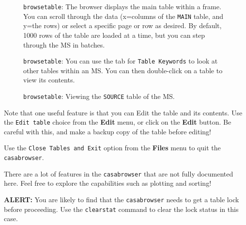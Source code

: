 \begin{figure}[h!]
\begin{center}
\caption{\label{fig:qcasabrowser1} {\tt browsetable}: The browser displays
  the main table within a frame. You can scroll
  through the data (x=columns of the {\tt MAIN} table, and y=the rows) or
  select a specific page or row as desired.  By default, 1000 rows of
  the table are loaded at a time, but you can step through the MS in batches.} 
\hrulefill
\end{center}
\end{figure}

\begin{figure}[h!]
\begin{center}
\caption{\label{fig:qcasabrowser2} {\tt browsetable}: You can use the
  tab for {\tt Table Keywords} to look at other tables within an MS.
  You can then double-click on a table to view its contents.} 
\hrulefill
\end{center}
\end{figure}
 
\begin{figure}[h!]
\begin{center}
\caption{\label{fig:qcasabrowser3} {\tt browsetable}: Viewing the 
{\tt SOURCE} table of the MS.}
\hrulefill
\end{center}
\end{figure}

Note that one useful feature is that you can Edit the table and its
contents.  Use the {\tt Edit table} choice from the {\bf Edit} menu,
or click on the {\bf Edit} button.  Be careful with this, and make
a backup copy of the table before editing!

Use the {\tt Close Tables and Exit} option from the {\bf Files} menu
to quit the {\tt casabrowser}.

There are a lot of features in the {\tt casabrowser}
that are not fully documented here.  Feel free to explore the
capabilities such as plotting and sorting!

{\bf ALERT:} You are likely to find that the {\tt casabrowser}
needs to get a table lock before proceeding.  Use the {\tt clearstat}
command to clear the lock status in this case.



